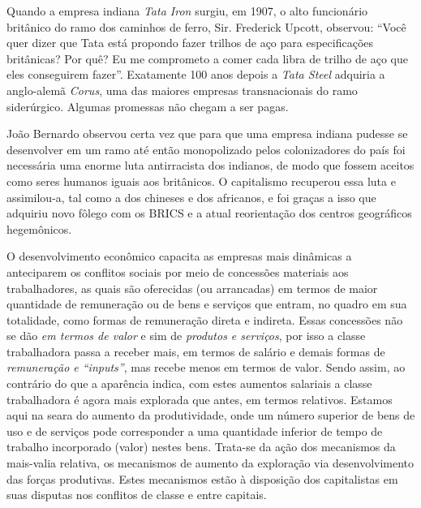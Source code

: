 Quando a empresa indiana \emph{Tata Iron} surgiu, em 1907, o alto
funcionário britânico do ramo dos caminhos de ferro, Sir. Frederick
Upcott, observou: ``Você quer dizer que Tata está propondo fazer trilhos
de aço para especificações britânicas? Por quê? Eu me comprometo a comer
cada libra de trilho de aço que eles conseguirem fazer''. Exatamente 100
anos depois a \emph{Tata Steel} adquiria a anglo-alemã \emph{Corus}, uma
das maiores empresas transnacionais do ramo siderúrgico. Algumas
promessas não chegam a ser pagas.

João Bernardo observou certa vez que para que uma empresa indiana
pudesse se desenvolver em um ramo até então monopolizado pelos
colonizadores do país foi necessária uma enorme luta antirracista dos
indianos, de modo que fossem aceitos como seres humanos iguais aos
britânicos. O capitalismo recuperou essa luta e assimilou-a, tal como a
dos chineses e dos africanos, e foi graças a isso que adquiriu novo
fôlego com os BRICS e a atual reorientação dos centros geográficos
hegemônicos.

O desenvolvimento econômico capacita as empresas mais dinâmicas a
anteciparem os conflitos sociais por meio de concessões materiais aos
trabalhadores, as quais são oferecidas (ou arrancadas) em termos de
maior quantidade de remuneração ou de bens e serviços que entram, no
quadro em sua totalidade, como formas de remuneração direta e indireta.
Essas concessões não se dão \emph{em termos de valor} e sim de
\emph{produtos e serviços}, por isso a classe trabalhadora passa a
receber mais, em termos de salário e demais formas de \emph{remuneração
e ``inputs''}, mas recebe menos em termos de valor. Sendo assim, ao
contrário do que a aparência indica, com estes aumentos salariais a
classe trabalhadora é agora mais explorada que antes, em termos
relativos. Estamos aqui na seara do aumento da produtividade, onde um
número superior de bens de uso e de serviços pode corresponder a uma
quantidade inferior de tempo de trabalho incorporado (valor) nestes
bens. Trata-se da ação dos mecanismos da mais-valia relativa, os
mecanismos de aumento da exploração via desenvolvimento das forças
produtivas. Estes mecanismos estão à disposição dos capitalistas em suas
disputas nos conflitos de classe e entre capitais.

